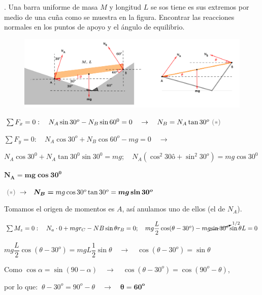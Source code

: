 \begin{prob}.
	Una barra uniforme de masa $M$ y longitud $L$ se sos	tiene es sus extremos por medio de una cuña como se muestra en la figura. Encontrar las reacciones normales en los puntos de apoyo y el ángulo de equilibrio.
\end{prob}

\begin{figure}[H]
	\centering
	\includegraphics[width=1\textwidth]{imagenes/imagenes06/T06IM17.png}
\end{figure}

$\sum F_x=0:\quad N_A\sin30^o-N_B\sin 60^0=0 \quad \to \quad N_B=N_A\tan 30^o \ \textcolor{gris}{(*)}$

$\sum F_y=0:\quad N_A \cos 30^o+ N_B \cos 60^o - mg = 0 \quad \to $

$N_A \cos 30^0 + N_A \tan 30^0 \sin 30^0 =mg;\quad N_A(\cos^2 30ô + \sin^2 30^o)=mg \cos 30^0$

$ \boldsymbol{N_A=mg\cos 30^0}$

$\textcolor{gris}{(*)}\ \to \quad \boldsymbol{N_B=}mg\cos 30^o \tan 30^o =\boldsymbol{mg \sin 30^o}$

Tomamos el origen de momentos es $A$, así anulamos uno de ellos (el de $N_A$).

$\sum M_z=0:\quad N_a\cdot 0 +mgr_C-NB\sin \theta r_B=0;\quad mg\dfrac L 2 \cos(\theta-30^o)-mg \cancelto{1/2}{\sin 30^o} \sin \theta L = 0$

$mg\dfrac L 2 \cos (\theta-30^o)=mgL \dfrac 1 2 \sin \theta \quad \to \quad \cos(\theta-30^o) = \sin \theta$

Como $\cos \alpha=\sin (90-\alpha) \quad \to \quad \cos(\theta-30^o)=\cos(90^o-\theta)$,

por lo que: $\ \theta-30^o=90^o - \theta \quad \to \quad \boldsymbol{\theta= 60^o}$



\newpage %

